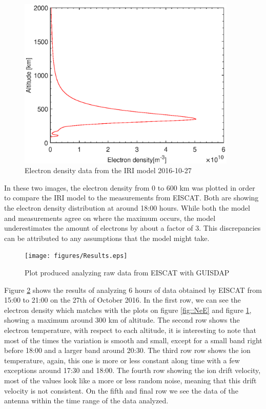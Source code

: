 \begin{minipage}{0.45\textwidth}
	\begin{flushright}
	\begin{figure}[H]
	\centering
	\includegraphics[width=0.93\textwidth]{figures/NeIRI.eps}
	\caption{Electron density data from the IRI model 2016-10-27}
	\label{fig::NeIRI1}
	\end{figure}
	\end{flushright}
\end{minipage}

In these two images, the electron density from 0 to 600 km was plotted in order to compare the IRI model to the measurements from EISCAT. Both are showing the electron density distribution at around 18:00 hours. While both the model and measurements agree on where the maximum occurs, the model underestimates the amount of electrons by about a factor of 3. This discrepancies can be attributed to any assumptions that the model might take.

\begin{figure}[H]
	\centering
	\texttt{[image: figures/Results.eps]}
	\caption{Plot produced analyzing raw data from EISCAT with GUISDAP}
	\label{fig::resultsE1}
\end{figure}

\newpage
Figure \ref{fig::resultsE1} shows the results of analyzing 6 hours of data obtained by EISCAT from 15:00  to 21:00 on the 27th of October 2016. In the first row, we can see the electron density which matches with the plots on figure \ref{fig::NeE} and figure \ref{fig::NeIRI1}, showing a maximum around 300 km of altitude. The second row shows the electron temperature, with respect to each altitude, it is interesting to note that most of the times the variation is smooth and small, except for a small band right before 18:00 and a larger band around 20:30. The third row row shows the ion temperature, again, this one is more or less constant along time with a few exceptions around 17:30 and 18:00. The fourth row showing the ion drift velocity,  most of the values look like a more or less random noise, meaning that this drift velocity is not consistent. On the fifth and final row we see the data of the antenna  within the time range of the data analyzed.
